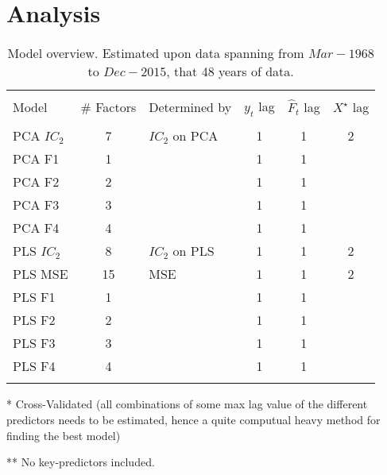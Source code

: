 \chapter{Analysis}

\begin{table}[H] \centering 
  \caption{Model overview. Estimated upon data spanning from $Mar - 1968$ to $Dec - 2015$, that 48 years of data.} 
  \label{tab:Models_Compared}
  \begin{center}
\begin{tabular}{@{\extracolsep{3pt}} lclccc} 
\hline \\[-1.8ex] 
Model &  \# Factors & Determined by & $y_t$ lag & $\hat{F}_t$ lag & $X^{\star}$ lag \\ 
\hline \\[-1.8ex] 
PCA $IC_2$ & 7 & $IC_2$ on PCA \tnote{*} & 1 & 1 & 2 \\ 
PCA F1\tnote{**} & 1 & & 1 & 1 &  \\ 
PCA F2\tnote{**} & 2 & & 1 & 1 &  \\ 
PCA F3\tnote{**} & 3 & & 1 & 1 &  \\ 
PCA F4\tnote{**} & 4 & & 1 & 1 &  \\ 
\midrule
PLS  $IC_2$ & 8 & $IC_2$ on PLS \tnote{*} & 1 & 1 & 2 \\ 
PLS  MSE & 15 & MSE  & 1 & 1 & 2 \\ 
PLS F1\tnote{**} & 1 & & 1 & 1 &  \\ 
PLS F2\tnote{**} & 2 & & 1 & 1 &  \\ 
PLS F3\tnote{**} & 3 & & 1 & 1 &  \\ 
PLS F4\tnote{**} & 4 & & 1 & 1 &  \\ 
\hline \\[-1.8ex] 
\end{tabular}
\end{center}
\begin{tablenotes}\footnotesize
\item[*] Cross-Validated (all combinations of some max lag value of the different predictors needs to be estimated, hence a quite computual heavy method for finding the best model) 
\item[**] No key-predictors included.
\end{tablenotes} 
\end{table} 
